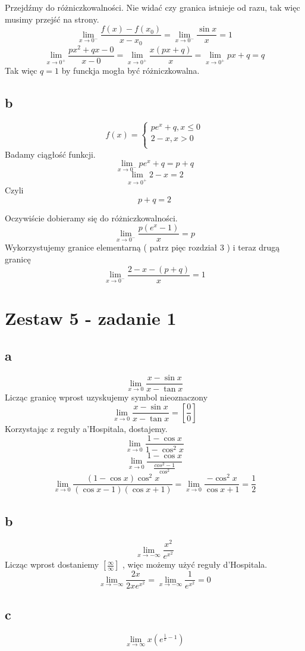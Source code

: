 \documentclass{article}
\begin{document}
Przejdźmy do różniczkowalności. Nie widać czy granica istnieje od razu, tak więc musimy przejść na strony.
$$\lim_{x \to 0^-}{\frac{f(x) - f(x_0)}{x-x_0}} = \lim_{x \to 0^-}{\frac{\sin{x}}{x}} = 1   $$
$$\lim_{x \to 0^+}{\frac{px^2 + qx - 0}{x-0}} = \lim_{x \to 0^+}{\frac{x(px + q)}{x}} = \lim_{x \to 0^+}{px+q} = q$$
Tak więc $q = 1$ by funckja mogła być różniczkowalna.

\subsection{b}
$$f(x) =
\begin{cases}
pe^x + q, x \leq 0 \\
2 - x , x > 0 \\
\end{cases}
$$
Badamy ciągłość funkcji.
$$\lim_{x \to 0^-}{pe^x+q} = p + q$$
$$\lim_{x \to 0^+}{2-x} = 2$$
Czyli $$ p + q = 2 $$

Oczywiście dobieramy się do różniczkowalności.
$$\lim_{x \to 0^-}{\frac{p(e^x-1)}{x}} = p$$
Wykorzystujemy granice elementarną ( patrz pięc rozdział 3 )
i teraz drugą granicę
$$\lim_{x \to 0^-}{\frac{2-x-(p+q)}{x}} = 1$$

\newpage
\section{Zestaw 5 - zadanie 1}
\subsection{a}
$$\lim_{x \to 0}{\frac{x-\sin{x}}{x-\tan{x}}}$$
Licząc granicę wprost uzyskujemy symbol nieoznaczony 
$$\lim_{x \to 0}{\frac{x-\sin{x}}{x-\tan{x}}} = \left[\frac{0}{0}\right]$$
Korzystając z reguły a'Hospitala, dostajemy.
$$\lim_{x \to 0}{\frac{1-\cos{x}}{1-\cos^2{x}}}$$
$$\lim_{x \to 0}{\frac{1-\cos{x}}{\frac{cos^2-1}{\cos^2}}}$$
$$\lim_{x \to 0}{\frac{(1-\cos{x})\cos^2{x}}{(\cos{x}-1)(\cos{x}+1)}} = \lim_{x \to 0}{\frac{-\cos^2{x}}{\cos{x}+1}} = \frac{1}{2} $$

\subsection{b}
$$\lim_{ x \to -\infty}{\frac{x^2}{e^{x^2}}} $$
Licząc wprost dostaniemy $[\frac{\infty}{\infty}]$ , więc możemy użyć reguły d'Hospitala.
$$\lim_{ x \to -\infty}{\frac{2x}{2x e^{x^2}}} = \lim_{ x \to -\infty}{\frac{1}{ e^{x^2}}} = 0$$

\subsection{c}
$$\lim_{x \to \infty}{x(e^{\frac{1}{x} - 1})}$$
\end{document}
